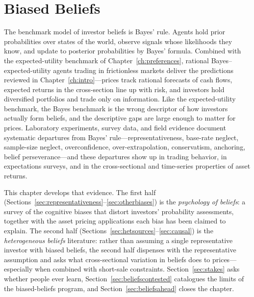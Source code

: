 \chapter{Biased Beliefs}
\label{ch:beliefs}

The benchmark model of investor beliefs is Bayes' rule. Agents hold prior probabilities over states of the world, observe signals whose likelihoods they know, and update to posterior probabilities by Bayes' formula. Combined with the expected-utility benchmark of Chapter~\ref{ch:preferences}, rational Bayes--expected-utility agents trading in frictionless markets deliver the predictions reviewed in Chapter~\ref{ch:intro}---prices track rational forecasts of cash flows, expected returns in the cross-section line up with risk, and investors hold diversified portfolios and trade only on information. Like the expected-utility benchmark, the Bayes benchmark is the wrong descriptor of how investors actually form beliefs, and the descriptive gaps are large enough to matter for prices. Laboratory experiments, survey data, and field evidence document systematic departures from Bayes' rule---representativeness, base-rate neglect, sample-size neglect, overconfidence, over-extrapolation, conservatism, anchoring, belief perseverance---and these departures show up in trading behavior, in expectations surveys, and in the cross-sectional and time-series properties of asset returns.

This chapter develops that evidence. The first half (Sections~\ref{sec:representativeness}--\ref{sec:otherbiases}) is the \emph{psychology of beliefs}: a survey of the cognitive biases that distort investors' probability assessments, together with the asset pricing applications each bias has been claimed to explain. The second half (Sections~\ref{sec:hetsources}--\ref{sec:causal}) is the \emph{heterogeneous beliefs} literature: rather than assuming a single representative investor with biased beliefs, the second half dispenses with the representative assumption and asks what cross-sectional variation in beliefs does to prices---especially when combined with short-sale constraints. Section~\ref{sec:stakes} asks whether people ever learn, Section~\ref{sec:beliefscontested} catalogues the limits of the biased-beliefs program, and Section~\ref{sec:beliefsahead} closes the chapter.

